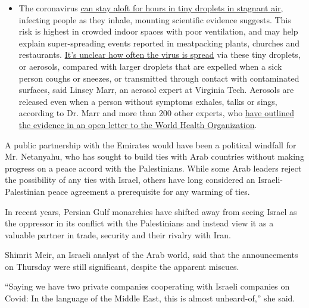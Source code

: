 \begin{itemize}
  \begin{itemize}
  \tightlist
  \item
    The coronavirus
    \href{https://www.nytimes.com/2020/07/04/health/239-experts-with-one-big-claim-the-coronavirus-is-airborne.html?action=click\&pgtype=Article\&state=default\&region=MAIN_CONTENT_3\&context=storylines_faq}{can
    stay aloft for hours in tiny droplets in stagnant air}, infecting
    people as they inhale, mounting scientific evidence suggests. This
    risk is highest in crowded indoor spaces with poor ventilation, and
    may help explain super-spreading events reported in meatpacking
    plants, churches and restaurants.
    \href{https://www.nytimes.com/2020/07/06/health/coronavirus-airborne-aerosols.html?action=click\&pgtype=Article\&state=default\&region=MAIN_CONTENT_3\&context=storylines_faq}{It's
    unclear how often the virus is spread} via these tiny droplets, or
    aerosols, compared with larger droplets that are expelled when a
    sick person coughs or sneezes, or transmitted through contact with
    contaminated surfaces, said Linsey Marr, an aerosol expert at
    Virginia Tech. Aerosols are released even when a person without
    symptoms exhales, talks or sings, according to Dr. Marr and more
    than 200 other experts, who
    \href{https://academic.oup.com/cid/article/doi/10.1093/cid/ciaa939/5867798}{have
    outlined the evidence in an open letter to the World Health
    Organization}.
  \end{itemize}
\end{itemize}

A public partnership with the Emirates would have been a political
windfall for Mr. Netanyahu, who has sought to build ties with Arab
countries without making progress on a peace accord with the
Palestinians. While some Arab leaders reject the possibility of any ties
with Israel, others have long considered an Israeli-Palestinian peace
agreement a prerequisite for any warming of ties.

In recent years, Persian Gulf monarchies have shifted away from seeing
Israel as the oppressor in its conflict with the Palestinians and
instead view it as a valuable partner in trade, security and their
rivalry with Iran.

Shimrit Meir, an Israeli analyst of the Arab world, said that the
announcements on Thursday were still significant, despite the apparent
miscues.

``Saying we have two private companies cooperating with Israeli
companies on Covid: In the language of the Middle East, this is almost
unheard-of,'' she said.

